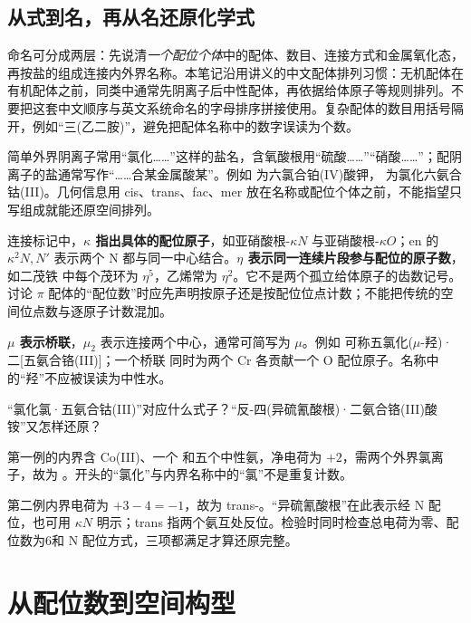 \subsection{从式到名，再从名还原化学式}
命名可分成两层：先说清\emph{一个配位个体}中的配体、数目、连接方式和金属氧化态，再按盐的组成连接内外界名称。本笔记沿用讲义的中文配体排列习惯：无机配体在有机配体之前，同类中通常先阴离子后中性配体，再依据给体原子等规则排列。不要把这套中文顺序与英文系统命名的字母排序拼接使用。复杂配体的数目用括号隔开，例如“三(乙二胺)”，避免把配体名称中的数字误读为个数。

简单外界阴离子常用“氯化……”这样的盐名，含氧酸根用“硫酸……”“硝酸……”；配阴离子的盐通常写作“……合某金属酸某”。例如  为六氯合铂(IV)酸钾， 为氯化六氨合钴(III)。几何信息用 cis、trans、fac、mer 放在名称或配位个体之前，不能指望只写组成就能还原空间排列。

连接标记中，\textbf{$\kappa$ 指出具体的配位原子}，如亚硝酸根-$\kappa N$ 与亚硝酸根-$\kappa O$；en 的 $\kappa^2N,N'$ 表示两个 N 都与同一中心结合。\textbf{$\eta$ 表示同一连续片段参与配位的原子数}，如二茂铁 \ce{[Fe(C5H5)2]} 中每个茂环为 $\eta^5$，乙烯常为 $\eta^2$。它不是两个孤立给体原子的齿数记号。讨论 $\pi$ 配体的“配位数”时应先声明按原子还是按配位位点计数；不能把传统的空间位点数与逐原子计数混加。

\textbf{$\mu$ 表示桥联}，$\mu_2$ 表示连接两个中心，通常可简写为 $\mu$。例如  可称五氯化($\mu$-羟)·二[五氨合铬(III)]；一个桥联  同时为两个 Cr 各贡献一个 O 配位原子。名称中的“羟”不应被误读为中性水。

\begin{worked}[把名字中的信息逐项还原]
“氯化氯·五氨合钴(III)”对应什么式子？“反-四(异硫氰酸根)·二氨合铬(III)酸铵”又怎样还原？

第一例的内界含 Co(III)、一个  和五个中性氨，净电荷为 $+2$，需两个外界氯离子，故为 。开头的“氯化”与内界名称中的“氯”不是重复计数。

第二例内界电荷为 $+3-4=-1$，故为 trans-。“异硫氰酸根”在此表示经 N 配位，也可用 $\kappa N$ 明示；trans 指两个氨互处反位。检验时同时检查总电荷为零、配位数为6和 N 配位方式，三项都满足才算还原完整。
\end{worked}

\section{从配位数到空间构型}

